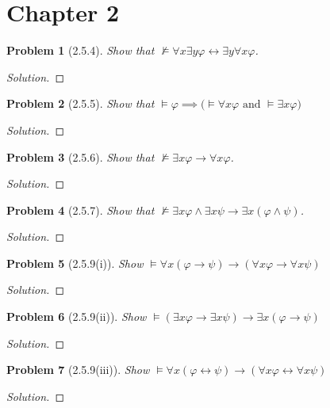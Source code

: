 \documentclass[letter]{article}
\newtheorem{problem}{Problem}
\theoremstyle{definition}
\newenvironment{solution}
{\begin{proof}[Solution]}
        {\end{proof}}
\renewcommand{\phi}{\varphi}
\begin{document}
\section{Chapter 2}
\begin{problem}[2.5.4]
    Show that $\not \models \forall x \exists y \phi \leftrightarrow \exists y \forall x \phi$.
\end{problem}
\begin{solution}
\end{solution}

\begin{problem}[2.5.5]
    Show that $\models \phi \implies \big(\models \forall x \phi \textrm{ and } \models \exists x \phi\big)$
\end{problem}
\begin{solution}
\end{solution}

\begin{problem}[2.5.6]
    Show that $\not \models \exists x \phi \to \forall x \phi$.
\end{problem}
\begin{solution}
\end{solution}

\begin{problem}[2.5.7]
    Show that $\not \models \exists x \phi \land \exists x \psi \to \exists x (\phi \land \psi)$.
\end{problem}
\begin{solution}
\end{solution}

\begin{problem}[2.5.9(i)]
    Show $\models \forall x(\phi \to \psi) \to (\forall x \phi \to \forall x \psi)$
\end{problem}
\begin{solution}
\end{solution}

\begin{problem}[2.5.9(ii)]
    Show $\models (\exists x \phi \to \exists x \psi) \to \exists x (\phi \to \psi)$
\end{problem}
\begin{solution}
\end{solution}

\begin{problem}[2.5.9(iii)]
    Show $\models \forall x (\phi \leftrightarrow \psi) \to (\forall x \phi \leftrightarrow \forall x \psi)$
\end{problem}
\begin{solution}
\end{solution}
\end{document}
